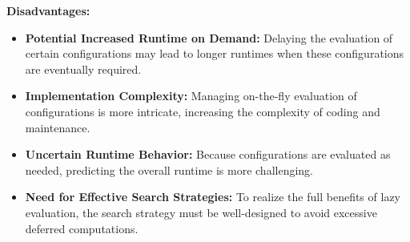 \documentclass[a4paper]{article}
\begin{document}
\vspace{0.35cm}

\noindent\textbf{Disadvantages:}
\begin{itemize}
        \item \textbf{Potential Increased Runtime on Demand:} Delaying the evaluation of certain configurations may lead to longer runtimes when these configurations are eventually required.
        \item \textbf{Implementation Complexity:} Managing on-the-fly evaluation of configurations is more intricate, increasing the complexity of coding and maintenance.
        \item \textbf{Uncertain Runtime Behavior:} Because configurations are evaluated as needed, predicting the overall runtime is more challenging.
        \item \textbf{Need for Effective Search Strategies:} To realize the full benefits of lazy evaluation, the search strategy must be well-designed to avoid excessive deferred computations.
    \end{itemize}
\end{document}
